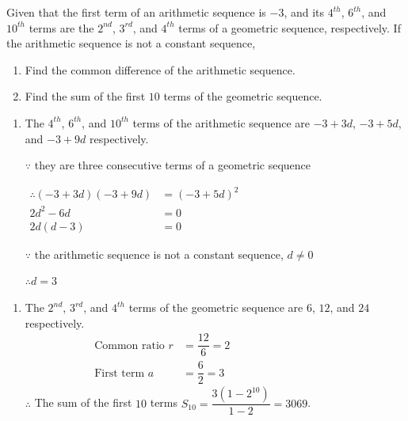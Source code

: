 \documentclass{report}
\begin{document}
        \begin{question}
            Given that the first term of an arithmetic sequence is $-3$, and its $4^{th}$, $6^{th}$, and $10^{th}$ terms are the $2^{nd}$, $3^{rd}$, and $4^{th}$ terms of a geometric sequence, respectively. If the arithmetic sequence is not a constant sequence,
            \vspace{-1em}
            \begin{enumerate}[label=(\alph*)]
                \item Find the common difference of the arithmetic sequence.

                \item Find the sum of the first $10$ terms of the geometric sequence.
            \end{enumerate}

            \sol{}
            \vspace{-1em}
            \begin{enumerate}[label=(\alph*)]
                \item The $4^{th}$, $6^{th}$, and $10^{th}$ terms of the arithmetic sequence are $-3+3d$, $-3+5d$, and $-3+9d$ respectively.

                $\because$ they are three consecutive terms of a geometric sequence
    
                $\begin{aligned}
                    \therefore(-3+3 d)(-3+9 d) & =(-3+5 d)^2 \\
                    2 d^2-6 d & =0 \\
                    2 d(d-3) & =0
                    \end{aligned}$
    
                    $\because$ the arithmetic sequence is not a constant sequence, $d \neq 0$
    
                    $\therefore d=3$
            \end{enumerate}
        \end{question}

        \setcounter{Question}{27}
        \begin{question}
            \begin{enumerate}[label=(\alph*), start=2]
                \item The $2^{nd}$, $3^{rd}$, and $4^{th}$ terms of the geometric sequence are $6$, $12$, and $24$ respectively.
                    \begin{align*}
                        \text{Common ratio } r &= \dfrac{12}{6} = 2 &&&&&&&&&&&& \\
                        \text{First term } a &= \dfrac{6}{2} = 3
                    \end{align*}
                    $\therefore$ The sum of the first $10$ terms $S_10 = \dfrac{3(1-2^{10})}{1-2} = 3069$.
            \end{enumerate}
        \end{question}
\end{document}
